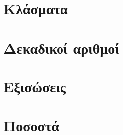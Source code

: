 \tiaskhseis
\chapter{Κλάσματα}
\tignwrizw
\tiaskhseis
\chapter{Δεκαδικοί αριθμοί}
\tignwrizw
\tiaskhseis
\chapter{Εξισώσεις}
\tignwrizw
\tiaskhseis
\chapter{Ποσοστά}
\tignwrizw
\tiaskhseis
